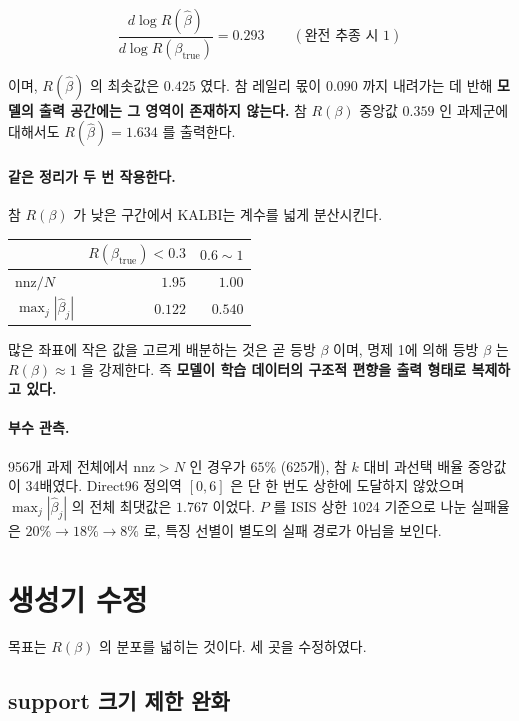 \documentclass[11pt]{article}
\newcommand{\Rq}{R(\beta)}
\newcommand{\bhat}{\hat{\beta}}
\begin{document}
\begin{equation}
\frac{d \log R(\bhat)}{d \log R(\beta_{\mathrm{true}})} = 0.293
\qquad (\text{완전 추종 시 } 1)
\end{equation}

이며, $R(\bhat)$ 의 최솟값은 $0.425$ 였다.
참 레일리 몫이 $0.090$ 까지 내려가는 데 반해
\textbf{모델의 출력 공간에는 그 영역이 존재하지 않는다.}
참 $\Rq$ 중앙값 $0.359$ 인 과제군에 대해서도 $R(\bhat) = 1.634$ 를 출력한다.

\paragraph{같은 정리가 두 번 작용한다.}
참 $\Rq$ 가 낮은 구간에서 KALBI는 계수를 넓게 분산시킨다.

\begin{table}[h]
\centering
\begin{tabular}{@{}lrr@{}}
\toprule
 & $R(\beta_{\mathrm{true}}) < 0.3$ & $0.6 \sim 1$ \\
\midrule
$\mathrm{nnz}/N$   & $1.95$ & $1.00$ \\
$\max_j|\bhat_j|$  & $0.122$ & $0.540$ \\
\bottomrule
\end{tabular}
\end{table}

많은 좌표에 작은 값을 고르게 배분하는 것은 곧 등방 $\beta$ 이며,
명제 1에 의해 등방 $\beta$ 는 $\Rq \approx 1$ 을 강제한다.
즉 \textbf{모델이 학습 데이터의 구조적 편향을 출력 형태로 복제하고 있다.}

\paragraph{부수 관측.}
956개 과제 전체에서
$\mathrm{nnz} > N$ 인 경우가 $65\%$ (625개),
참 $k$ 대비 과선택 배율 중앙값이 34배였다.
Direct96 정의역 $[0,6]$ 은 단 한 번도 상한에 도달하지 않았으며
$\max_j|\bhat_j|$ 의 전체 최댓값은 $1.767$ 이었다.
$P$ 를 ISIS 상한 1024 기준으로 나눈 실패율은
$20\% \to 18\% \to 8\%$ 로, 특징 선별이 별도의 실패 경로가 아님을 보인다.

\section{생성기 수정}

목표는 $\Rq$ 의 분포를 넓히는 것이다. 세 곳을 수정하였다.

\subsection{support 크기 제한 완화}
\end{document}
